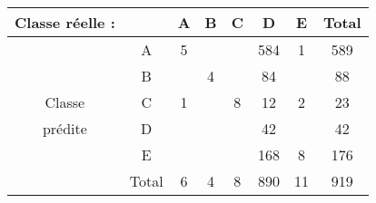 \begin{tabular}{c|c|c|c|c|c|c|c}
Classe réelle :&	&A&	B&	C&	D&	E&	Total\\
\hline
\hline
	&	A&	5&	&	&	584&	1&	589\\
	&	B&	&	4&	&	84&	&	88\\
Classe &	C&	1&	&	8&	12&	2&	23\\
prédite&	D&	&	&	&	42&	&	42\\
	&	E&	&	&	&	168&	8&	176\\
\hline
	&	Total&	6&	4&	8&	890&	11&	919\\
\end{tabular}
